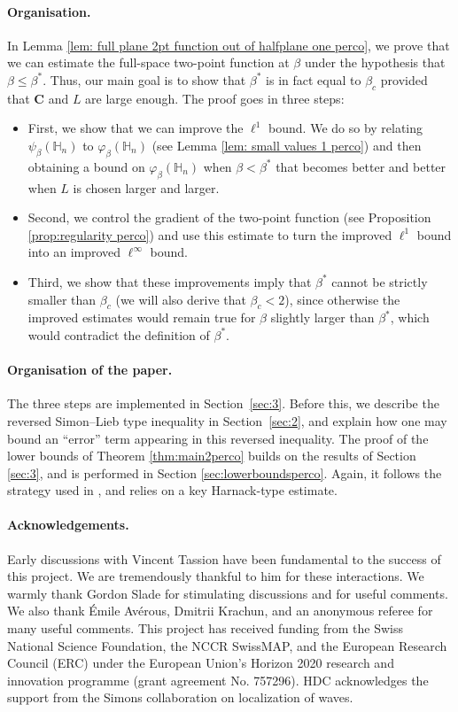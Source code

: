\documentclass[11pt,a4paper]{article}
\numberwithin{equation}{section}
\theoremstyle{plain}
\theoremstyle{definition}
\newcommand\bfC{\mathbf{C}}
\begin{document}
\paragraph{Organisation.} In Lemma \ref{lem: full plane 2pt function out of halfplane one perco}, we prove that we can estimate the full-space two-point function at $\beta$ under the hypothesis that $\beta\leq \beta^*$. Thus, our main goal is to show that $\beta^*$ is in fact equal to $\beta_c$ provided that $\bfC$ and $L$ are large enough. The proof goes in three steps:
\begin{itemize}
\item First, we show that we can improve the $\ell^1$ bound. We do so by relating $\psi_\beta(\mathbb H_{n})$ to $\varphi_\beta(\mathbb H_n)$ (see Lemma \ref{lem: small values 1 perco}) and then obtaining a bound on $\varphi_\beta(\mathbb H_n)$ when $\beta<\beta^*$ that becomes better and better when $L$ is chosen larger and larger. 
\item Second, we control the gradient of the two-point function (see Proposition \ref{prop:regularity perco}) and use this estimate to turn the improved $\ell^1$ bound into an improved $\ell^\infty$ bound.
\item Third, we show that these improvements imply that $\beta^*$ cannot be strictly smaller than $\beta_c$ (we will also derive that $\beta_c<2$), since otherwise the improved estimates would remain true for $\beta$ slightly larger than $\beta^*$, which would contradict the definition of $\beta^*$. 
\end{itemize}
\paragraph{Organisation of the paper.} The three steps are implemented in Section~\ref{sec:3}.  Before this, we describe the reversed Simon--Lieb type inequality in 
Section~\ref{sec:2}, and explain how one may bound an ``error'' term appearing in this reversed inequality. The proof of the lower bounds of Theorem \ref{thm:main2perco} builds on the results of Section \ref{sec:3}, and is performed in Section \ref{sec:lowerboundsperco}. Again, it follows the strategy used in \cite{DumPan24WSAW}, and relies on a key Harnack-type estimate.

\paragraph{Acknowledgements.} Early discussions with Vincent Tassion have been fundamental to the success of this project. We are tremendously thankful to him for these interactions. We warmly thank Gordon Slade for stimulating discussions and for useful comments. We also thank Émile Avérous, Dmitrii Krachun, and an anonymous referee for many useful comments.
 This project has received funding from the Swiss National Science Foundation, the NCCR SwissMAP, and the European Research Council (ERC) under the European Union’s Horizon 2020 research and innovation programme (grant agreement No. 757296). HDC acknowledges the support from the Simons collaboration on localization of waves. 
\end{document}
